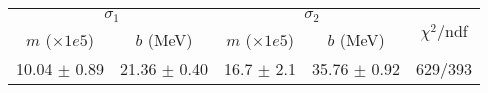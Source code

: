 \begin{tabular}{cc|cc||c}
\multicolumn{2}{c|}{$\sigma_1$} & \multicolumn{2}{|c}{$\sigma_2$}  & \multirow{2}{*}{$\chi^2/$ndf}\\
$m$ ($\times1e5$) & $b$ (MeV) & $m$ ($\times1e5$) & $b$ (MeV)  & \\
\hline
10.04 $\pm$ 0.89 & 21.36 $\pm$ 0.40 & 16.7 $\pm$ 2.1 & 35.76 $\pm$ 0.92 & 629/393\\
\end{tabular}
